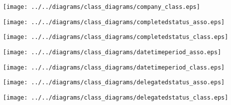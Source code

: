     \begin{frame}
    \begin{center}
    \texttt{[image: ../../diagrams/class\_diagrams/company\_class.eps]}
    \end{center}
    \end{frame}
    

    \begin{frame}
    \begin{center}
    \texttt{[image: ../../diagrams/class\_diagrams/completedstatus\_asso.eps]}
    \end{center}
    \end{frame}
    

    \begin{frame}
    \begin{center}
    \texttt{[image: ../../diagrams/class\_diagrams/completedstatus\_class.eps]}
    \end{center}
    \end{frame}
    

    \begin{frame}
    \begin{center}
    \texttt{[image: ../../diagrams/class\_diagrams/datetimeperiod\_asso.eps]}
    \end{center}
    \end{frame}
    

    \begin{frame}
    \begin{center}
    \texttt{[image: ../../diagrams/class\_diagrams/datetimeperiod\_class.eps]}
    \end{center}
    \end{frame}
    

    \begin{frame}
    \begin{center}
    \texttt{[image: ../../diagrams/class\_diagrams/delegatedstatus\_asso.eps]}
    \end{center}
    \end{frame}
    

    \begin{frame}
    \begin{center}
    \texttt{[image: ../../diagrams/class\_diagrams/delegatedstatus\_class.eps]}
    \end{center}
    \end{frame}
    

